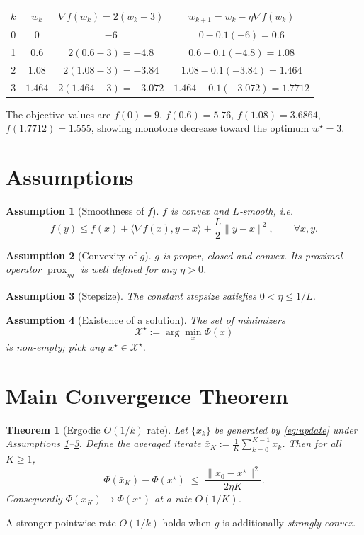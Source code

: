 \documentclass{article}
\newtheorem{theorem}{Theorem}
\newtheorem{assumption}{Assumption}
\newcommand{\prox}{\operatorname{prox}}
\newcommand{\grad}{\nabla}
\begin{document}
\begin{center}
\begin{tabular}{c|c|c|c}
$k$ & $w_k$ & $\grad f(w_k)=2(w_k-3)$ & $w_{k+1}=w_k-\eta\grad f(w_k)$\\ \hline
0 & $0$ & $-6$ & $0-0.1(-6)=0.6$ \\
1 & $0.6$ & $2(0.6-3)=-4.8$ & $0.6-0.1(-4.8)=1.08$\\
2 & $1.08$ & $2(1.08-3)=-3.84$ & $1.08-0.1(-3.84)=1.464$\\
3 & $1.464$ & $2(1.464-3)=-3.072$ & $1.464-0.1(-3.072)=1.7712$
\end{tabular}
\end{center}
The objective values are $f(0)=9$, $f(0.6)=5.76$, $f(1.08)=3.6864$, $f(1.7712)=1.555$,
showing monotone decrease toward the optimum $w^\star=3$.

\newpage

\section*{Assumptions}
\begin{assumption}[Smoothness of $f$]\label{ass:smooth}
$f$ is convex and $L$‑smooth, i.e.
\[
f(y)\le f(x)+\langle\grad f(x),y-x\rangle+\frac{L}{2}\|y-x\|^2,\qquad\forall x,y.
\]
\end{assumption}
\begin{assumption}[Convexity of $g$]\label{ass:convex}
$g$ is proper, closed and convex. Its proximal operator $\prox_{\eta g}$ is well defined for any $\eta>0$.
\end{assumption}
\begin{assumption}[Stepsize]\label{ass:step}
The constant stepsize satisfies $0<\eta\le 1/L$.
\end{assumption}
\begin{assumption}[Existence of a solution]\label{ass:solution}
The set of minimizers 
\[
\mathcal{X}^\star:=\arg\min_{x}\Phi(x)
\]
is non‑empty; pick any $x^\star\in\mathcal{X}^\star$.
\end{assumption}

\section*{Main Convergence Theorem}
\begin{theorem}[Ergodic $O(1/k)$ rate]\label{thm:ergodic}
Let $\{x_k\}$ be generated by \eqref{eq:update} under Assumptions \ref{ass:smooth}–\ref{ass:step}.
Define the averaged iterate $\bar{x}_K:=\frac{1}{K}\sum_{k=0}^{K-1}x_k$.
Then for all $K\ge1$,
\[
\Phi(\bar{x}_K)-\Phi(x^\star)\;\le\;\frac{\|x_0-x^\star\|^2}{2\eta K}.
\]
Consequently $\Phi(\bar{x}_K)\to\Phi(x^\star)$ at a rate $O(1/K)$.
\end{theorem}
A stronger pointwise rate $O(1/k)$ holds when $g$ is additionally \emph{strongly convex}.
\end{document}
